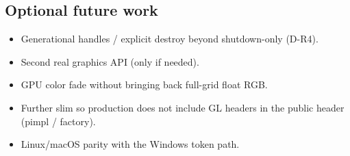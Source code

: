 \subsection{Optional future work}
\begin{itemize}
  \item Generational handles / explicit destroy beyond shutdown-only (D-R4).
  \item Second real graphics API (only if needed).
  \item GPU color fade without bringing back full-grid float RGB.
  \item Further slim  so production does not include GL headers
        in the public header (pimpl / factory).
  \item Linux/macOS parity with the Windows token path.
\end{itemize}
